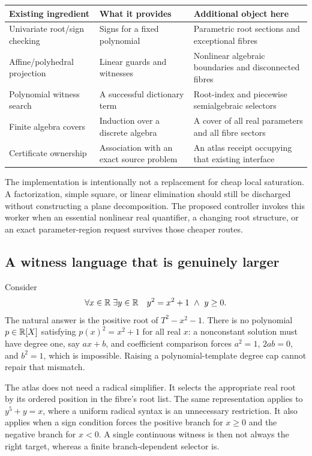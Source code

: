 \begin{center}
\begin{tabular}{p{}p{}p{}}
\toprule
Existing ingredient & What it provides & Additional object here\\
\midrule
Univariate root/sign checking & Signs for a fixed polynomial & Parametric root sections and exceptional fibres\\
Affine/polyhedral projection & Linear guards and witnesses & Nonlinear algebraic boundaries and disconnected fibres\\
Polynomial witness search & A successful dictionary term & Root-index and piecewise semialgebraic selectors\\
Finite algebra covers & Induction over a discrete algebra & A cover of all real parameters and all fibre sectors\\
Certificate ownership & Association with an exact source problem & An atlas receipt occupying that existing interface\\
\bottomrule
\end{tabular}
\end{center}

The implementation is intentionally not a replacement for cheap local saturation. A factorization, simple square, or linear elimination should still be discharged without constructing a plane decomposition. The proposed controller invokes this worker when an essential nonlinear real quantifier, a changing root structure, or an exact parameter-region request survives those cheaper routes.

\subsection{A witness language that is genuinely larger}
Consider
\[
 \forall x\in\mathbb R\;\exists y\in\mathbb R\quad y^2=x^2+1\ \wedge\ y\geq0.
\]
The natural answer is the positive root of $T^2-x^2-1$. There is no polynomial $p\in\mathbb R[X]$ satisfying $p(x)^2=x^2+1$ for all real $x$: a nonconstant solution must have degree one, say $ax+b$, and coefficient comparison forces $a^2=1$, $2ab=0$, and $b^2=1$, which is impossible. Raising a polynomial-template degree cap cannot repair that mismatch.

The atlas does not need a radical simplifier. It selects the appropriate real root by its ordered position in the fibre's root list. The same representation applies to $y^5+y=x$, where a uniform radical syntax is an unnecessary restriction. It also applies when a sign condition forces the positive branch for $x\geq0$ and the negative branch for $x<0$. A single continuous witness is then not always the right target, whereas a finite branch-dependent selector is.

